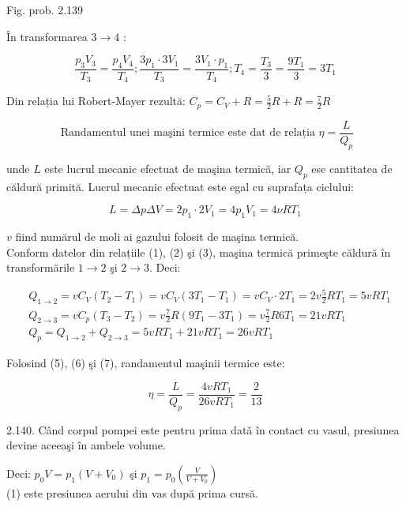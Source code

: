 \documentclass[10pt]{article}
\begin{document}
Fig. prob. 2.139

În transformarea $3 \rightarrow 4$ :


\begin{equation*}
\frac{p_{3} V_{3}}{T_{3}}=\frac{p_{4} V_{4}}{T_{4}} ; \frac{3 p_{1} \cdot 3 V_{1}}{T_{3}}=\frac{3 V_{1} \cdot p_{1}}{T_{4}} ; T_{4}=\frac{T_{3}}{3}=\frac{9 T_{1}}{3}=3 T_{1} \tag{3}
\end{equation*}


Din relația lui Robert-Mayer rezultă: $C_{p}=C_{V}+R=\frac{5}{2} R+R=\frac{7}{2} R$


\begin{equation*}
\text { Randamentul unei maşini termice este dat de relația } \eta=\frac{L}{Q_{p}} \tag{4}
\end{equation*}


unde $L$ este lucrul mecanic efectuat de maşina termică, iar $Q_{p}$ ese cantitatea de căldură primită. Lucrul mecanic efectuat este egal cu suprafața ciclului:


\begin{equation*}
L=\Delta p \Delta V=2 p_{1} \cdot 2 V_{1}=4 p_{1} V_{1}=4 \nu R T_{1} \tag{6}
\end{equation*}


$v$ fiind numărul de moli ai gazului folosit de maşina termică.\\
Conform datelor din relațiile (1), (2) şi (3), maşina termică primeşte căldură în transformările $1 \rightarrow 2$ şi $2 \rightarrow 3$. Deci:


\begin{align*}
& Q_{1 \rightarrow 2}=v C_{V}\left(T_{2}-T_{1}\right)=v C_{V}\left(3 T_{1}-T_{1}\right)=v C_{V} \cdot 2 T_{1}=2 v \frac{5}{2} R T_{1}=5 v R T_{1} \\
& Q_{2 \rightarrow 3}=v C_{p}\left(T_{3}-T_{2}\right)=v \frac{7}{2} R\left(9 T_{1}-3 T_{1}\right)=v \frac{7}{2} R 6 T_{1}=21 v R T_{1} \\
& Q_{p}=Q_{1 \rightarrow 2}+Q_{2 \rightarrow 3}=5 v R T_{1}+21 v R T_{1}=26 v R T_{1} \tag{7}
\end{align*}


Folosind (5), (6) şi (7), randamentul maşinii termice este:

$$
\eta=\frac{L}{Q_{p}}=\frac{4 v R T_{1}}{26 v R T_{1}}=\frac{2}{13}
$$

2.140. Când corpul pompei este pentru prima datǎ în contact cu vasul, presiunea devine aceeaşi în ambele volume.

Deci: $p_{0} V=p_{1}\left(V+V_{0}\right)$ şi $p_{1}=p_{0}\left(\frac{V}{V+V_{0}}\right)$\\
(1) este presiunea aerului din vas după prima cursă.
\end{document}
